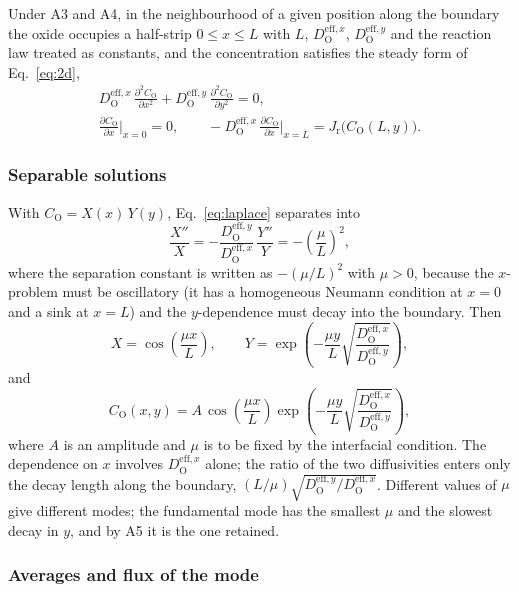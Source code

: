 \documentclass[12pt]{article}
\newcommand{\eff}{\mathrm{eff}}
\newcommand{\Ox}{\mathrm{O}}
\newcommand{\Dx}{D_{\Ox}^{\eff,x}}
\newcommand{\Dy}{D_{\Ox}^{\eff,y}}
\newcommand{\Jr}{J_{\mathrm{r}}}
\begin{document}
Under A3 and A4, in the neighbourhood of a given position along the boundary
the oxide occupies a half-strip \(0\le x\le L\) with \(L\), \(\Dx\), \(\Dy\)
and the reaction law treated as constants, and the concentration satisfies
the steady form of Eq.~\eqref{eq:2d},
\begin{equation}
\begin{gathered}
\Dx\,\frac{\partial^2 C_{\Ox}}{\partial x^2}
+\Dy\,\frac{\partial^2 C_{\Ox}}{\partial y^2}=0,\\
\frac{\partial C_{\Ox}}{\partial x}\bigg|_{x=0}=0,
\qquad
-\Dx\,\frac{\partial C_{\Ox}}{\partial x}\bigg|_{x=L}=\Jr\bigl(C_{\Ox}(L,y)\bigr).
\end{gathered}
\label{eq:laplace}
\end{equation}

\subsubsection{Separable solutions}

With \(C_{\Ox}=X(x)\,Y(y)\), Eq.~\eqref{eq:laplace} separates into
\begin{equation}
\frac{X''}{X}=-\frac{\Dy}{\Dx}\,\frac{Y''}{Y}=-\left(\frac{\mu}{L}\right)^2,
\end{equation}
where the separation constant is written as \(-(\mu/L)^2\) with \(\mu>0\),
because the \(x\)-problem must be oscillatory (it has a homogeneous Neumann
condition at \(x=0\) and a sink at \(x=L\)) and the \(y\)-dependence must
decay into the boundary. Then
\begin{equation}
X=\cos\!\left(\frac{\mu x}{L}\right),
\qquad
Y=\exp\!\left(-\frac{\mu y}{L}\sqrt{\frac{\Dx}{\Dy}}\right),
\end{equation}
and
\begin{equation}
C_{\Ox}(x,y)=A\,\cos\!\left(\frac{\mu x}{L}\right)
 \exp\!\left(-\frac{\mu y}{L}\sqrt{\frac{\Dx}{\Dy}}\right),
\label{eq:mode}
\end{equation}
where \(A\) is an amplitude and \(\mu\) is to be fixed by the interfacial
condition. The dependence on \(x\) involves \(\Dx\) alone; the ratio of the
two diffusivities enters only the decay length along the boundary,
\((L/\mu)\sqrt{\Dy/\Dx}\). Different values of \(\mu\) give different modes;
the fundamental mode has the smallest \(\mu\) and the slowest decay in \(y\),
and by A5 it is the one retained.

\subsubsection{Averages and flux of the mode}
\end{document}
